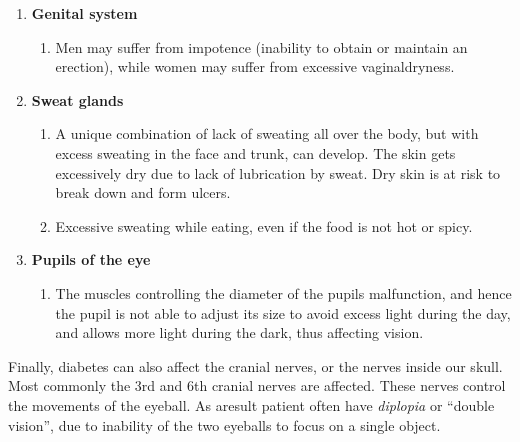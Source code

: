\begin{enumerate}[•]
\begin{enumerate}[o]
\itemsep=0pt
\item The bladder muscles get paralyzed, and fail to empty the bladder, even when the bladder becomes full. As a result, urine may overflow, causing social embarrassment.
\item The bladder muscles may not contract properly to empty the\break bladder completely when urinating. So a small amount of urine is left behind in the bladder, and this creates the urge to urinate again and again.
\item Due to the stagnation of urine in the bladder, there is a higher risk of bladder infections.
\end{enumerate}
\item \textbf{Genital system}
\begin{enumerate}[o]
\itemsep=0pt
\item Men may suffer from impotence (inability to obtain or maintain an erection), while women may suffer from excessive vaginal\break dryness.
\end{enumerate}
\item \textbf{Sweat glands}
\begin{enumerate}[o]
\itemsep=0pt
\item A unique combination of lack of sweating all over the body, but with excess sweating in the face and trunk, can develop. The skin gets excessively dry due to lack of lubrication by sweat. Dry skin is at risk to break down and form ulcers.
\item Excessive sweating while eating, even if the food is not hot or spicy.
\end{enumerate}
\item \textbf{Pupils of the eye}
\begin{enumerate}[o]
\itemsep=0pt
\item The muscles controlling the diameter of the pupils malfunction, and hence the pupil is not able to adjust its size to avoid excess light during the day, and allows more light during the dark, thus affecting vision.
\end{enumerate}
\end{enumerate}

Finally, diabetes can also affect the cranial nerves, or the nerves inside our skull. Most commonly the 3rd and 6th cranial nerves are affected. These nerves control the movements of the eyeball. As a\break result patient often have \textit{diplopia} or “double vision”, due to inability of the two eyeballs to focus on a single object.

